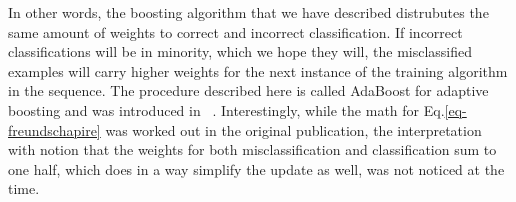\begin{refsection}
In other words, the boosting algorithm that we have described distrubutes the same amount of weights to correct and incorrect classification. If incorrect classifications will be in minority, which we hope they will, the misclassified examples will carry higher weights for the next instance of the training algorithm in the sequence. The procedure described here is called AdaBoost for adaptive boosting and was introduced in ~\citep{FreundSchapire1997}. Interestingly, while the math for Eq.\ref{eq-freundschapire} was worked out in the original publication, the interpretation with notion that the weights for both misclassification and classification sum to one half, which does in a way simplify the update as well, was not noticed at the time.





\printbibliography[heading=subbibliography]
\end{refsection}